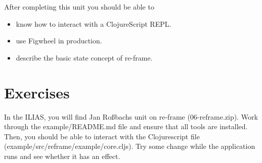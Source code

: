 \documentclass[11pt,a4paper]{article}
\begin{document}
After completing this unit you should be able to

\begin{itemize}
    \item know how to interact with a ClojureScript REPL.
    \item use Figwheel in production.
    \item describe the basic state concept of re-frame.
\end{itemize}



\section{Exercises}

\begin{exercise}[Tooling]

    In the ILIAS, you will find Jan Ro\ss{}bachs unit on re-frame (06-reframe.zip).
    Work through the example/README.md file and ensure that all tools are installed.
    Then, you should be able to interact with the Clojurescript file (example/src/reframe/example/core.cljs).
    Try some change while the application runs and see whether it has an effect.


\end{exercise}
\end{document}
